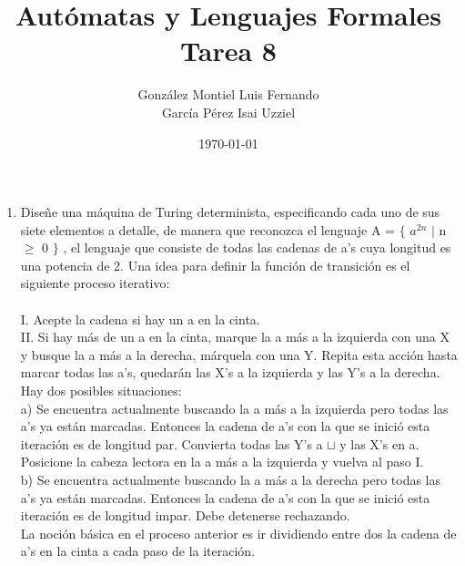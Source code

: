\documentclass[letterpaper,10pt]{article}
\title{Autómatas y Lenguajes Formales \\ Tarea 8}
\author{González Montiel Luis Fernando\\ García Pérez Isai Uzziel\\}
\date{\today}
\begin{document}
\maketitle

	\begin{enumerate}

    \item Diseñe una máquina de Turing determinista, especificando cada uno de sus siete elementos a detalle, de manera que reconozca el lenguaje A = $\lbrace$ $a^{2n}$ $\mid$ n $\geq$ 0 $\rbrace$ , el lenguaje que consiste de todas
las cadenas de a’s cuya longitud es una potencia de 2. Una idea para definir la función de transición
es el siguiente proceso iterativo:\\ \\
	I. Acepte la cadena si hay un a en la cinta.\\
	II. Si hay más de un a en la cinta, marque la a más a la izquierda con una X y busque la
	a más a la derecha, márquela con una Y. Repita esta acción hasta marcar todas las
	a’s, quedarán las X’s a la izquierda y las Y’s a la derecha. Hay dos posibles situaciones:\\
	a) Se encuentra actualmente buscando la a más a la izquierda pero todas las a’s ya
	están marcadas. Entonces la cadena de a’s con la que se inició esta iteración es
	de longitud par. Convierta todas las Y’s a $\sqcup$ y las X’s en a. Posicione la cabeza
	lectora en la a más a la izquierda y vuelva al paso I.\\
	b) Se encuentra actualmente buscando la a más a la derecha pero todas las a’s ya
	están marcadas. Entonces la cadena de a’s con la que se inició esta iteración es
	de longitud impar. Debe detenerse rechazando.\\
La noción básica en el proceso anterior es ir dividiendo entre dos la cadena de a’s en la cinta a cada
paso de la iteración.
   

\end{enumerate}
\end{document}

